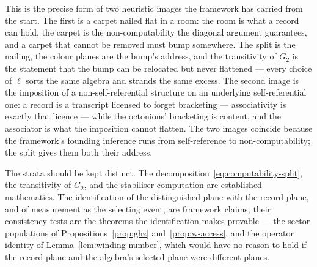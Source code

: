 This is the precise form of two heuristic images the framework has
carried from the start. The first is a carpet nailed flat in a room:
the room is what a record can hold, the carpet is the non-computability
the diagonal argument guarantees, and a carpet that cannot be removed
must bump somewhere. The split is the nailing, the colour planes are
the bump's address, and the transitivity of $G_2$ is the statement that
the bump can be relocated but never flattened --- every choice of
$\ell$ sorts the same algebra and strands the same excess. The second
image is the imposition of a non-self-referential structure on an
underlying self-referential one: a record is a transcript licensed to
forget bracketing --- associativity is exactly that licence --- while
the octonions' bracketing is content, and the associator is what the
imposition cannot flatten. The two images coincide because the
framework's founding inference runs from self-reference to
non-computability; the split gives them both their address.

The strata should be kept distinct. The
decomposition~\eqref{eq:computability-split}, the transitivity of $G_2$,
and the stabiliser computation are established mathematics. The
identification of the distinguished plane with the record plane, and of
measurement as the selecting event, are framework claims; their
consistency tests are the theorems the identification makes provable ---
the sector populations of Propositions~\ref{prop:ghz}
and~\ref{prop:w-access}, and the operator identity of
Lemma~\ref{lem:winding-number}, which would have no reason to hold if
the record plane and the algebra's selected plane were different planes.

